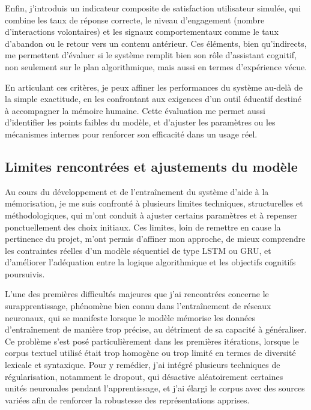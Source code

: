 \documentclass[11pt,a4paper]{report}
\begin{document}
Enfin, j’introduis un indicateur composite de satisfaction utilisateur simulée, qui combine les taux de réponse correcte, le niveau d’engagement (nombre d’interactions volontaires) et les signaux comportementaux comme le taux d’abandon ou le retour vers un contenu antérieur. Ces éléments, bien qu’indirects, me permettent d’évaluer si le système remplit bien son rôle d’assistant cognitif, non seulement sur le plan algorithmique, mais aussi en termes d’expérience vécue.

En articulant ces critères, je peux affiner les performances du système au-delà de la simple exactitude, en les confrontant aux exigences d’un outil éducatif destiné à accompagner la mémoire humaine. Cette évaluation me permet aussi d’identifier les points faibles du modèle, et d’ajuster les paramètres ou les mécanismes internes pour renforcer son efficacité dans un usage réel.

\subsection{Limites rencontrées et ajustements du modèle}

Au cours du développement et de l’entraînement du système d’aide à la mémorisation, je me suis confronté à plusieurs limites techniques, structurelles et méthodologiques, qui m’ont conduit à ajuster certains paramètres et à repenser ponctuellement des choix initiaux. Ces limites, loin de remettre en cause la pertinence du projet, m’ont permis d’affiner mon approche, de mieux comprendre les contraintes réelles d’un modèle séquentiel de type LSTM ou GRU, et d’améliorer l’adéquation entre la logique algorithmique et les objectifs cognitifs poursuivis.

L’une des premières difficultés majeures que j’ai rencontrées concerne le surapprentissage, phénomène bien connu dans l’entraînement de réseaux neuronaux, qui se manifeste lorsque le modèle mémorise les données d’entraînement de manière trop précise, au détriment de sa capacité à généraliser. Ce problème s’est posé particulièrement dans les premières itérations, lorsque le corpus textuel utilisé était trop homogène ou trop limité en termes de diversité lexicale et syntaxique. Pour y remédier, j’ai intégré plusieurs techniques de régularisation, notamment le dropout, qui désactive aléatoirement certaines unités neuronales pendant l’apprentissage, et j’ai élargi le corpus avec des sources variées afin de renforcer la robustesse des représentations apprises.
\end{document}

